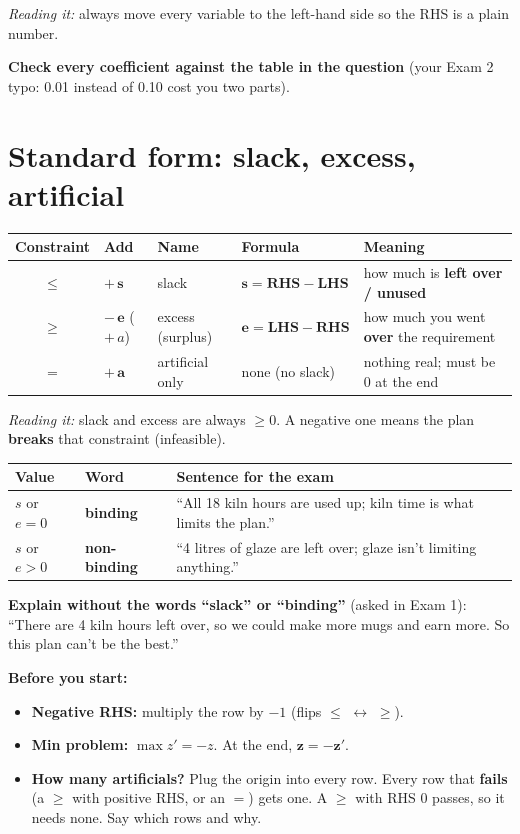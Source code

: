 \documentclass[10pt,a4paper]{article}
\newcommand{\reading}[1]{\textit{Reading it:} #1}
\newcommand{\thead}[1]{\textbf{#1}}
\newcommand{\Le}{\ensuremath{\leq}}
\newcommand{\Ge}{\ensuremath{\geq}}
\begin{document}
\reading{always move every variable to the left-hand side so the RHS is a plain number.}

\textbf{Check every coefficient against the table in the question} (your Exam 2 typo: 0.01 instead of 0.10 cost you two parts).

\section{Standard form: slack, excess, artificial}

\begin{tabularx}{\linewidth}{@{}c l l l L@{}}
\toprule
\thead{Constraint} & \thead{Add} & \thead{Name} & \thead{Formula} & \thead{Meaning} \\
\midrule
\Le & $\mathbf{+\,s}$ & slack & $\mathbf{s = \text{RHS} - \text{LHS}}$ & how much is \textbf{left over / unused} \\
\Ge & $\mathbf{-\,e}$ ($+\,a$) & excess (surplus) & $\mathbf{e = \text{LHS} - \text{RHS}}$ & how much you went \textbf{over} the requirement \\
$=$ & $\mathbf{+\,a}$ & artificial only & none (no slack) & nothing real; must be 0 at the end \\
\bottomrule
\end{tabularx}

\reading{slack and excess are always $\geq 0$. A negative one means the plan \textbf{breaks} that constraint (infeasible).}

\begin{tabularx}{\linewidth}{@{}l l L@{}}
\toprule
\thead{Value} & \thead{Word} & \thead{Sentence for the exam} \\
\midrule
$s$ or $e = 0$ & \textbf{binding} & ``All 18 kiln hours are used up; kiln time is what limits the plan.'' \\
$s$ or $e > 0$ & \textbf{non-binding} & ``4 litres of glaze are left over; glaze isn't limiting anything.'' \\
\bottomrule
\end{tabularx}

\textbf{Explain without the words ``slack'' or ``binding''} (asked in Exam 1): ``There are 4 kiln hours left over, so we could make more mugs and earn more. So this plan can't be the best.''

\textbf{Before you start:}
\begin{itemize}
  \item \textbf{Negative RHS:} multiply the row by $-1$ (flips \Le{} $\leftrightarrow$ \Ge).
  \item \textbf{Min problem:} $\max z' = -z$. At the end, $\mathbf{z = -z'}$.
  \item \textbf{How many artificials?} Plug the origin into every row. Every row that \textbf{fails} (a \Ge{} with positive RHS, or an $=$) gets one. A \Ge{} with RHS 0 passes, so it needs none. Say which rows and why.
\end{itemize}
\end{document}
